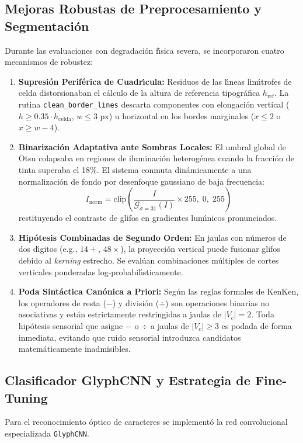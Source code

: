\documentclass[conference]{IEEEtran}
\begin{document}
\subsection{Mejoras Robustas de Preprocesamiento y Segmentaci\'on}
Durante las evaluaciones con degradaci\'on f\'{\i}sica severa, se incorporaron cuatro mecanismos de robustez:
\begin{enumerate}
    \item \textbf{Supresi\'on Perif\'erica de Cuadr\'{\i}cula:} Residuos de las l\'{\i}neas lim\'{\i}trofes de celda distorsionaban el c\'alculo de la altura de referencia tipogr\'afica $h_{\text{ref}}$. La rutina \texttt{clean\_border\_lines} descarta componentes con elongaci\'on vertical ($h \ge 0.35 \cdot h_{\text{celda}}$, $w \le 3\text{ px}$) u horizontal en los bordes marginales ($x \le 2$ o $x \ge w-4$).
    \item \textbf{Binarizaci\'on Adaptativa ante Sombras Locales:} El umbral global de Otsu colapsaba en regiones de iluminaci\'on heterog\'enea cuando la fracci\'on de tinta superaba el 18\%. El sistema conmuta din\'amicamente a una normalizaci\'on de fondo por desenfoque gaussiano de baja frecuencia:
    \begin{equation}
        I_{\text{norm}} = \text{clip}\left(\frac{I}{\mathcal{G}_{\sigma=31}(I)} \times 255, \; 0, \; 255\right)
    \end{equation}
    restituyendo el contraste de glifos en gradientes lum\'{\i}nicos pronunciados.
    \item \textbf{Hip\'otesis Combinadas de Segundo Orden:} En jaulas con n\'umeros de dos d\'{\i}gitos (e.g., $14+$, $48\times$), la proyecci\'on vertical puede fusionar glifos debido al \textit{kerning} estrecho. Se eval\'uan combinaciones m\'ultiples de cortes verticales ponderadas log-probabil\'{\i}sticamente.
    \item \textbf{Poda Sint\'actica Can\'onica a Priori:} Seg\'un las reglas formales de KenKen, los operadores de resta ($-$) y divisi\'on ($\div$) son operaciones binarias no asociativas y est\'an estrictamente restringidas a jaulas de $|V_c| = 2$. Toda hip\'otesis sensorial que asigne $-$ o $\div$ a jaulas de $|V_c| \ge 3$ es podada de forma inmediata, evitando que ruido sensorial introduzca candidatos matem\'aticamente inadmisibles.
\end{enumerate}

\subsection{Clasificador GlyphCNN y Estrategia de Fine-Tuning}
Para el reconocimiento \'optico de caracteres se implement\'o la red convolucional especializada \texttt{GlyphCNN}.
\end{document}
